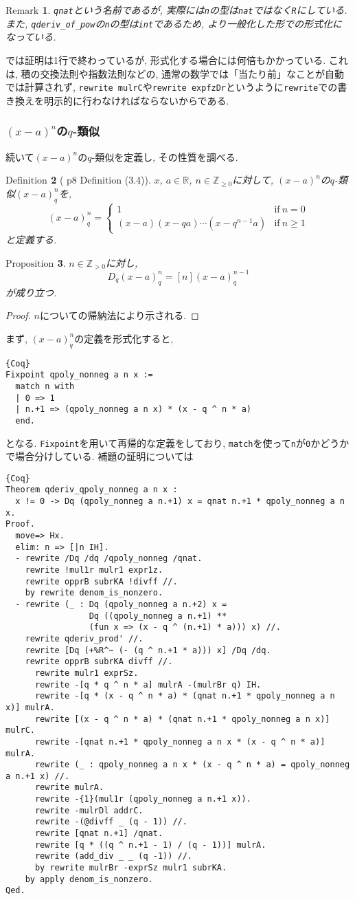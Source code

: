 \documentclass[11pt]{jarticle}
\theoremstyle{mystyle}
\newtheorem{df}{$\textrm{Definition}$}[subsubsection]
\newtheorem{prop}[df]{$\textrm{Proposition}$}
\newtheorem{rmk}[df]{$\textrm{Remark}$}
\newcommand{\bdf}{\begin{shadebox} \begin{df}}
\newcommand{\edf}{\end{df} \end{shadebox}}
\newcommand{\bprop}{\begin{shadebox} \begin{prop}}
\newcommand{\eprop}{\end{prop} \end{shadebox}}
\newcommand{\brmk}{\begin{rmk}}
\newcommand{\ermk}{\end{rmk}}
\newcommand{\bpf}{\begin{proof}}
\newcommand{\epf}{\end{proof}}
\newcommand{\Z}{\mathbb{Z}}
\newcommand{\R}{\mathbb{R}}
\newcommand{\0}{\textbf{0}}
\newcommand{\1}{\textbf{1}}
\newcommand{\2}{\textbf{2}}
\begin{document}
\brmk
  {\tt qnat}という名前であるが, 実際には{\tt n}の型は{\tt nat}ではなく{\tt R}にしている. 
  また, {\tt qderiv\_of\_pow}の{\tt n}の型は{\tt int}であるため, より一般化した形での形式化に
  なっている. 
\ermk
\cite{Kac}では証明は1行で終わっているが, 形式化する場合には何倍もかかっている. これは, 積の交換法則や指数法則などの, 通常の数学では「当たり前」なことが自動では計算されず, {\tt rewrite mulrC}や{\tt rewrite expfzDr}というように{\tt rewrite}での書き換えを明示的に行わなければならないからである. \\
\subsubsection{$(x - a)^n$の$q$-類似}
続いて$(x - a)^n$の$q$-類似を定義し, その性質を調べる.  
\bdf[\cite{Kac} p8 Definition (3.4)]
  $x$, $a \in \R$, $n \in \Z_{\ge 0}$に対して, $(x - a)^n$の$q$-類似$(x - a)^n_q$を, 
  \[
  (x - a)^n_q = \begin{cases}
                      1 & \text{if}\ n = 0 \\
                      (x - a) (x - qa) \cdots (x - q^{n - 1} a) & \text{if}\ n \ge 1
                    \end{cases}
  \]
  と定義する. 
\edf
\bprop \label{q_deriv_qpoly_nonneg}
  $n\in\Z_{>0}$に対し, 
  \[
    D_q(x-a)^n_q = [n](x-a)^{n-1}_q
  \]
  が成り立つ. 
\eprop
\bpf
  $n$についての帰納法により示される. 
\epf
まず, $(x - a)^n_q$の定義を形式化すると, 
\begin{lstlisting}{Coq}
Fixpoint qpoly_nonneg a n x :=
  match n with
  | 0 => 1
  | n.+1 => (qpoly_nonneg a n x) * (x - q ^ n * a)
  end.
\end{lstlisting}
となる. {\tt Fixpoint}を用いて再帰的な定義をしており, {\tt match}を使って{\tt n}が{\tt 0}かどうかで場合分けしている. 補題の証明については 
\begin{lstlisting}{Coq}
Theorem qderiv_qpoly_nonneg a n x :
  x != 0 -> Dq (qpoly_nonneg a n.+1) x = qnat n.+1 * qpoly_nonneg a n x.
Proof.
  move=> Hx.
  elim: n => [|n IH].
  - rewrite /Dq /dq /qpoly_nonneg /qnat.
    rewrite !mul1r mulr1 expr1z.
    rewrite opprB subrKA !divff //.
    by rewrite denom_is_nonzero.
  - rewrite (_ : Dq (qpoly_nonneg a n.+2) x =
                 Dq ((qpoly_nonneg a n.+1) **
                 (fun x => (x - q ^ (n.+1) * a))) x) //.
    rewrite qderiv_prod' //.
    rewrite [Dq (+%R^~ (- (q ^ n.+1 * a))) x] /Dq /dq.
    rewrite opprB subrKA divff //.
      rewrite mulr1 exprSz.
      rewrite -[q * q ^ n * a] mulrA -(mulrBr q) IH.
      rewrite -[q * (x - q ^ n * a) * (qnat n.+1 * qpoly_nonneg a n x)] mulrA.
      rewrite [(x - q ^ n * a) * (qnat n.+1 * qpoly_nonneg a n x)] mulrC.
      rewrite -[qnat n.+1 * qpoly_nonneg a n x * (x - q ^ n * a)] mulrA.
      rewrite (_ : qpoly_nonneg a n x * (x - q ^ n * a) = qpoly_nonneg a n.+1 x) //.
      rewrite mulrA.
      rewrite -{1}(mul1r (qpoly_nonneg a n.+1 x)).
      rewrite -mulrDl addrC.
      rewrite -(@divff _ (q - 1)) //.
      rewrite [qnat n.+1] /qnat.
      rewrite [q * ((q ^ n.+1 - 1) / (q - 1))] mulrA.
      rewrite (add_div _ _ (q -1)) //.
      by rewrite mulrBr -exprSz mulr1 subrKA.
    by apply denom_is_nonzero.
Qed.
\end{lstlisting}
\end{document}
